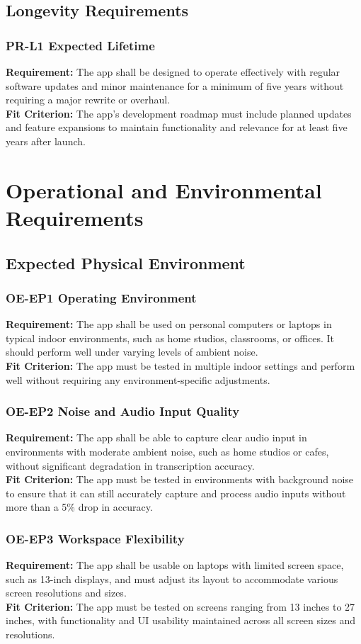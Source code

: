 \documentclass[12pt]{article}
\begin{document}
\subsection{Longevity Requirements}
\subsubsection*{PR-L1 Expected Lifetime}
\textbf{Requirement:} The app shall be designed to operate effectively with regular software updates and minor maintenance for a minimum of five years without requiring a major rewrite or overhaul.\\
\textbf{Fit Criterion:} The app’s development roadmap must include planned updates and feature expansions to maintain functionality and relevance for at least five years after launch.

\section{Operational and Environmental Requirements}
\subsection{Expected Physical Environment}
\subsubsection*{OE-EP1 Operating Environment}
\textbf{Requirement:} The app shall be used on personal computers or laptops in typical indoor environments, such as home studios, classrooms, or offices. It should perform well under varying levels of ambient noise.\\
\textbf{Fit Criterion:} The app must be tested in multiple indoor settings and perform well without requiring any environment-specific adjustments.
\subsubsection*{OE-EP2 Noise and Audio Input Quality}
\textbf{Requirement:} The app shall be able to capture clear audio input in environments with moderate ambient noise, such as home studios or cafes, without significant degradation in transcription accuracy.\\
\textbf{Fit Criterion:} The app must be tested in environments with background noise to ensure that it can still accurately capture and process audio inputs without more than a 5\% drop in accuracy.
\subsubsection*{OE-EP3 Workspace Flexibility}
\textbf{Requirement:} The app shall be usable on laptops with limited screen space, such as 13-inch displays, and must adjust its layout to accommodate various screen resolutions and sizes.\\
\textbf{Fit Criterion:} The app must be tested on screens ranging from 13 inches to 27 inches, with functionality and UI usability maintained across all screen sizes and resolutions.
\end{document}
